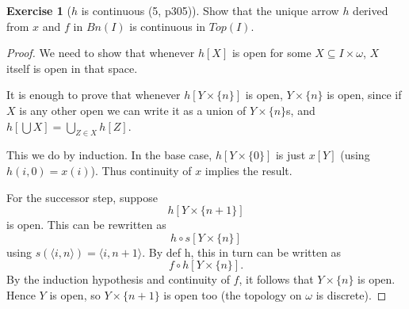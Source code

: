 \documentclass{article}
\theoremstyle{definition}
\newtheorem{ex}{Exercise}
\begin{document}
\begin{ex}[$h$ is continuous (5, p305)]

    Show that the unique arrow $h$ derived from $x$ and $f$ in $Bn(I)$ 
    is continuous in $Top(I)$.


\end{ex}
\begin{proof}
    We need to show that whenever $h[X]$ is open for some $X \subseteq I \times \omega$, 
    $X$ itself is open in that space.

    It is enough to prove that whenever $h[Y \times \{n\}]$ is open,
    $Y \times \{n\}$ is open, since if $X$ is any other open
    we can write it as a union of $Y \times \{n\}$s, and 
    $h[\bigcup X] = \bigcup_{Z \in X} h[Z]$.

    This we do by induction. In the base case, $h[Y \times \{0\}]$
    is just $x[Y]$ (using $h(i, 0) = x(i)$).
    Thus continuity of $x$ implies the result.

    For the successor step, suppose \[ h[Y \times \{n+1\}]\] is open. 
    This can be rewritten as \[ h \circ s [Y \times \{n\}]\] 
    using $s(\langle i, n\rangle) = \langle i, n+1\rangle$. 
    By def h, this in turn can be written as \[f \circ h [Y \times \{n\}].\] 
    By the induction hypothesis and continuity of $f$, 
    it follows that $Y \times \{n\}$ is open. Hence $Y$ is open, so $Y \times \{n+1\}$
    is open too (the topology on $\omega$ is discrete).


\end{proof}
\end{document}
